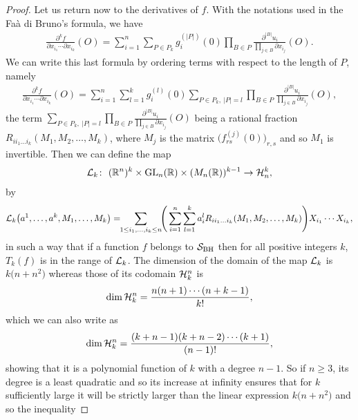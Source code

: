\documentclass[10pt,a4paper]{amsart}
\numberwithin{equation}{section}
\begin{document}
\begin{proof}
	Let us return now to the derivatives of $f$. With the notations used in the Fa\`a di Bruno's formula, we have
\begin{gather*}
\frac{\partial^kf}{\partial x_{i_1}\cdots\partial{x_{i_k}}}(O)=\sum_{i=1}^n\sum_{P\in P_k}g_i^{(\vert P\vert)}(0)\prod_{B\in P}\frac{\partial^{\vert B\vert} u_i}{\prod_{j\in B}{\partial x_{i_j}}}(O).
\end{gather*}
	We can write this last formula by ordering terms with respect to the length of $P$, namely
\begin{gather*}
\frac{\partial^kf}{\partial x_{i_1}\cdots\partial{x_{i_k}}}(O)=\sum_{i=1}^n\sum_{l=1}^kg_i^{(l)}(0)\sum_{P\in P_k,\ \vert P\vert=l}\prod_{B\in P}\frac{\partial^{\vert B\vert} u_i}{\prod_{j\in B}{\partial x_{i_j}}}(O),
\end{gather*}
	the term $\sum_{P\in P_k,\ \vert P\vert=l}\prod_{B\in P}\frac{\partial^{\vert B\vert} u_i}{\prod_{j\in B}{\partial x_{i_j}}}(O)$ being a rational fraction $R_{ii_1\dots i_k}(M_1,M_2,\dots,M_k)$, where $M_j$ is the matrix $\big(f^{(j)}_{rs}(0)\big)_{r,s}$ and so $M_1$ is invertible.
	Then we can define the map
\begin{gather*}
{\cal L}_k\colon\ (\mathbb{R}^n)^k\times {\rm GL}_n(\mathbb{R})\times(M_n(\mathbb{R}))^{k-1}\to{\cal H}_n^k,
\end{gather*}
by
\begin{gather*}
{\cal L}_k\big(a^1,\dots,a^k,M_1,\dots,M_k\big)=\!\!\sum_{1\leq i_1,\dots,i_k\leq n}\!\!\Bigg(\sum_{i=1}^n\sum_{l=1}^ka_i^lR_{ii_1\dots i_k}(M_1,M_2,\dots,M_k)\Bigg)X_{i_1}\cdots X_{i_k},
\end{gather*}
in such a way that if a function $f$ belongs to ${\cal S}_{\rm BH}$ then for all positive integers $k$, $T_k(f)$ is in the range of ${\cal L}_k$.
	The dimension of the domain of the map ${\cal L}_k$ is $k\big(n+n^2\big)$ whereas those of its codomain ${\cal H}_k^n$ is
\begin{gather*}
\operatorname{dim}{\cal H}_k^n=\frac{n(n+1)\cdots(n+k-1)}{k!},
\end{gather*}
	which we can also write as
\begin{gather*}
\operatorname{dim}{\cal H}_k^n=\frac{(k+n-1)(k+n-2)\cdots (k+1)}{(n-1)!},
\end{gather*}
	showing that it is a polynomial function of $k$ with a degree $n-1$. So if $n\geq 3$, its degree is a least quadratic and so its increase at infinity ensures that for $k$ sufficiently large it will be strictly larger than the linear expression $k\big(n+n^2\big)$ and so the inequality

\end{proof}
\end{document}
